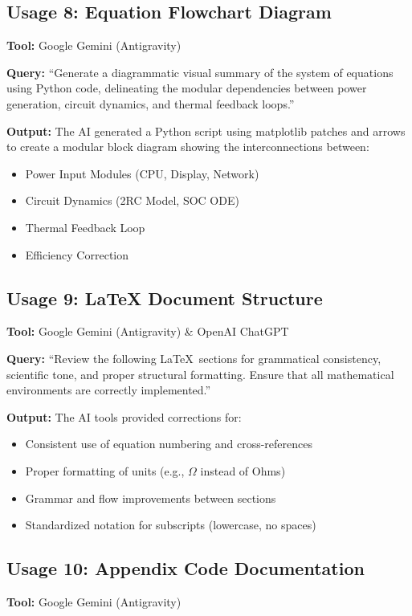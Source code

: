\documentclass[12pt]{article}
\begin{document}
\newpage

\subsection*{Usage 8: Equation Flowchart Diagram}
\textbf{Tool:} Google Gemini (Antigravity)

\textbf{Query:} ``Generate a diagrammatic visual summary of the system of equations using Python code, delineating the modular dependencies between power generation, circuit dynamics, and thermal feedback loops.''

\textbf{Output:} The AI generated a Python script using matplotlib patches and arrows to create a modular block diagram showing the interconnections between:
\begin{itemize}
    \item Power Input Modules (CPU, Display, Network)
    \item Circuit Dynamics (2RC Model, SOC ODE)
    \item Thermal Feedback Loop
    \item Efficiency Correction
\end{itemize}

\subsection*{Usage 9: LaTeX Document Structure}
\textbf{Tool:} Google Gemini (Antigravity) \& OpenAI ChatGPT

\textbf{Query:} ``Review the following \LaTeX\ sections for grammatical consistency, scientific tone, and proper structural formatting. Ensure that all mathematical environments are correctly implemented.''

\textbf{Output:} The AI tools provided corrections for:
\begin{itemize}
    \item Consistent use of equation numbering and cross-references
    \item Proper formatting of units (e.g., $\Omega$ instead of Ohms)
    \item Grammar and flow improvements between sections
    \item Standardized notation for subscripts (lowercase, no spaces)
\end{itemize}

\subsection*{Usage 10: Appendix Code Documentation}
\textbf{Tool:} Google Gemini (Antigravity)
\end{document}
